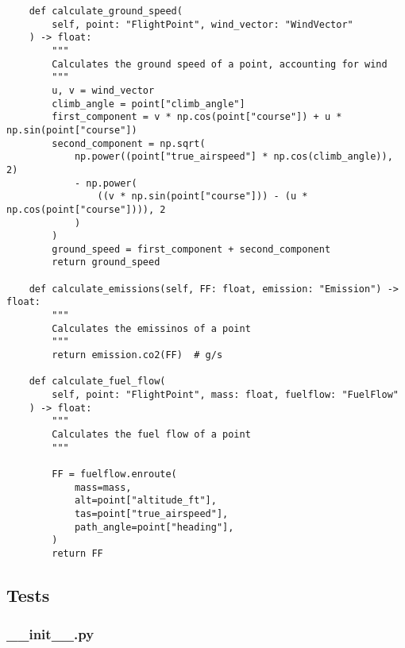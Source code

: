 \begin{verbatim}
    def calculate_ground_speed(
        self, point: "FlightPoint", wind_vector: "WindVector"
    ) -> float:
        """
        Calculates the ground speed of a point, accounting for wind
        """
        u, v = wind_vector
        climb_angle = point["climb_angle"]
        first_component = v * np.cos(point["course"]) + u * np.sin(point["course"])
        second_component = np.sqrt(
            np.power((point["true_airspeed"] * np.cos(climb_angle)), 2)
            - np.power(
                ((v * np.sin(point["course"])) - (u * np.cos(point["course"]))), 2
            )
        )
        ground_speed = first_component + second_component
        return ground_speed

    def calculate_emissions(self, FF: float, emission: "Emission") -> float:
        """
        Calculates the emissinos of a point
        """
        return emission.co2(FF)  # g/s

    def calculate_fuel_flow(
        self, point: "FlightPoint", mass: float, fuelflow: "FuelFlow"
    ) -> float:
        """
        Calculates the fuel flow of a point
        """

        FF = fuelflow.enroute(
            mass=mass,
            alt=point["altitude_ft"],
            tas=point["true_airspeed"],
            path_angle=point["heading"],
        )
        return FF

\end{verbatim}
\subsection{Tests}
\subsubsection{__init__.py}
\begin{verbatim}

\end{verbatim}
